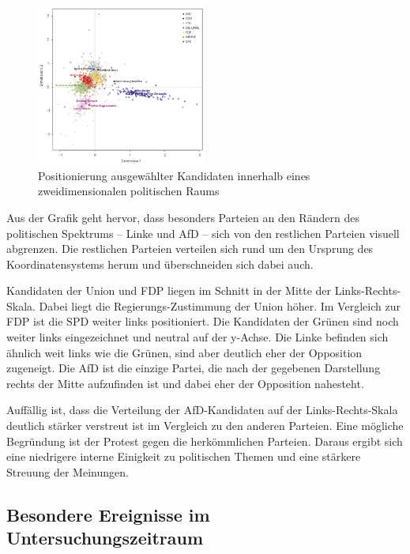\begin{figure}[H]
    \centering
    \includegraphics[width=0.5\textwidth]{data/images/positionierung_ausgewaehlter_kandidaten.png}
    \caption[Positionierung ausgewählter Kandidaten \autocite{saltzer_bundestagswahl_2022}]{Positionierung ausgewählter Kandidaten innerhalb eines zweidimensionalen politischen Raums \autocite{saltzer_bundestagswahl_2022}} \label{fig:positionierungAusgewaehlterKanidaten}
\end{figure}

Aus der Grafik geht hervor, dass besonders Parteien an den Rändern des politischen Spektrums -- Linke und \ac{AfD} -- sich von den restlichen Parteien visuell abgrenzen. Die restlichen Parteien verteilen sich rund um den Ursprung des Koordinatensystems herum und überschneiden sich dabei auch.

Kandidaten der Union und \ac{FDP} liegen im Schnitt in der Mitte der Links-Rechts-Skala. Dabei liegt die Regierungs-Zustimmung der Union höher. Im Vergleich zur \ac{FDP} ist die \ac{SPD} weiter links positioniert. Die Kandidaten der Grünen sind noch weiter links eingezeichnet und neutral auf der y-Achse. Die Linke befinden sich ähnlich weit links wie die Grünen, sind aber deutlich eher der Opposition zugeneigt. Die \ac{AfD} ist die einzige Partei, die nach der gegebenen Darstellung rechts der Mitte aufzufinden ist und dabei eher der Opposition nahesteht.

Auffällig ist, dass die Verteilung der \ac{AfD}-Kandidaten auf der Links-Rechts-Skala deutlich stärker verstreut ist im Vergleich zu den anderen Parteien. Eine mögliche Begründung ist der Protest gegen die herkömmlichen Parteien. Daraus ergibt sich eine niedrigere interne Einigkeit zu politischen Themen und eine stärkere Streuung der Meinungen.

\subsection{Besondere Ereignisse im Untersuchungszeitraum} \label{subsec:besondereEreignisse}

